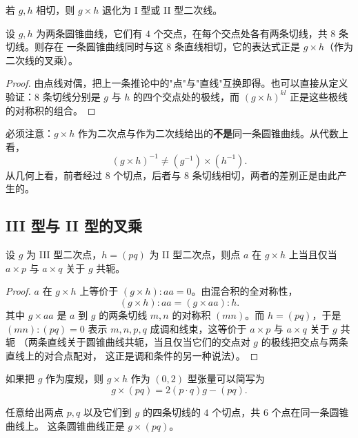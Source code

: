 若 $g,h$ 相切，则 $g\times h$ 退化为 I 型或 II 型二次线。

\begin{proposition}[二次线的叉乘]
设 $g,h$ 为两条圆锥曲线，它们有 $4$ 个交点，在每个交点处各有两条切线，共 $8$ 条切线。则存在
一条圆锥曲线同时与这 $8$ 条直线相切，它的表达式正是 $g\times h$（作为二次线的叉乘）。
\end{proposition}

\begin{proof}
由点线对偶，把上一条推论中的"点"与"直线"互换即得。也可以直接从定义验证：$8$ 条切线分别是
$g$ 与 $h$ 的四个交点处的极线，而 $(g\times h)^{kl}$ 正是这些极线的对称积的组合。
\end{proof}

\begin{remark}
必须注意：$g\times h$ 作为二次点与作为二次线给出的\textbf{不是}同一条圆锥曲线。从代数上看，
\[
(g\times h)^{-1}\ne(g^{-1})\times(h^{-1}) .
\]
从几何上看，前者经过 $8$ 个切点，后者与 $8$ 条切线相切，两者的差别正是由此产生的。
\end{remark}

\subsection{III 型与 II 型的叉乘}

\begin{proposition}
\label{prop:iii-ii}
设 $g$ 为 III 型二次点，$h=(pq)$ 为 II 型二次点，则点 $a$ 在 $g\times h$ 上当且仅当
$a\times p$ 与 $a\times q$ 关于 $g$ 共轭。
\end{proposition}

\begin{proof}
$a$ 在 $g\times h$ 上等价于 $(g\times h):aa=0$。由混合积的全对称性，
\[
(g\times h):aa=(g\times aa):h .
\]
其中 $g\times aa$ 是 $a$ 到 $g$ 的两条切线 $m,n$ 的对称积 $(mn)$。而 $h=(pq)$，于是
$(mn):(pq)=0$ 表示 $m,n,p,q$ 成调和线束，这等价于 $a\times p$ 与 $a\times q$ 关于 $g$ 共轭
（两条直线关于圆锥曲线共轭，当且仅当它们的交点对 $g$ 的极线把交点与两条直线上的对合点配对，
这正是调和条件的另一种说法）。
\end{proof}

如果把 $g$ 作为度规，则 $g\times h$ 作为 $(0,2)$ 型张量可以简写为
\[
g\times(pq)=2(p\cdot q)g-(pq).
\]

\begin{corollary}[$6$ 点共圆锥曲线]
任意给出两点 $p,q$ 以及它们到 $g$ 的四条切线的 $4$ 个切点，共 $6$ 个点在同一条圆锥曲线上。
这条圆锥曲线正是 $g\times(pq)$。
\end{corollary}

